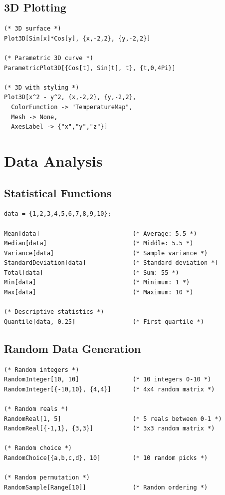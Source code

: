\documentclass[12pt,a4paper]{article}
\begin{document}
\subsection{3D Plotting}

\begin{commandbox}[3D Graphics]
\begin{lstlisting}
(* 3D surface *)
Plot3D[Sin[x]*Cos[y], {x,-2,2}, {y,-2,2}]

(* Parametric 3D curve *)
ParametricPlot3D[{Cos[t], Sin[t], t}, {t,0,4Pi}]

(* 3D with styling *)
Plot3D[x^2 - y^2, {x,-2,2}, {y,-2,2},
  ColorFunction -> "TemperatureMap",
  Mesh -> None,
  AxesLabel -> {"x","y","z"}]
\end{lstlisting}
\end{commandbox}

\section{Data Analysis}

\subsection{Statistical Functions}

\begin{commandbox}
\begin{lstlisting}
data = {1,2,3,4,5,6,7,8,9,10};

Mean[data]                          (* Average: 5.5 *)
Median[data]                        (* Middle: 5.5 *)
Variance[data]                      (* Sample variance *)
StandardDeviation[data]             (* Standard deviation *)
Total[data]                         (* Sum: 55 *)
Min[data]                           (* Minimum: 1 *)
Max[data]                           (* Maximum: 10 *)

(* Descriptive statistics *)
Quantile[data, 0.25]                (* First quartile *)
\end{lstlisting}
\end{commandbox}

\subsection{Random Data Generation}

\begin{commandbox}
\begin{lstlisting}
(* Random integers *)
RandomInteger[10, 10]               (* 10 integers 0-10 *)
RandomInteger[{-10,10}, {4,4}]      (* 4x4 random matrix *)

(* Random reals *)
RandomReal[1, 5]                    (* 5 reals between 0-1 *)
RandomReal[{-1,1}, {3,3}]           (* 3x3 random matrix *)

(* Random choice *)
RandomChoice[{a,b,c,d}, 10]         (* 10 random picks *)

(* Random permutation *)
RandomSample[Range[10]]             (* Random ordering *)
\end{lstlisting}
\end{commandbox}
\end{document}
